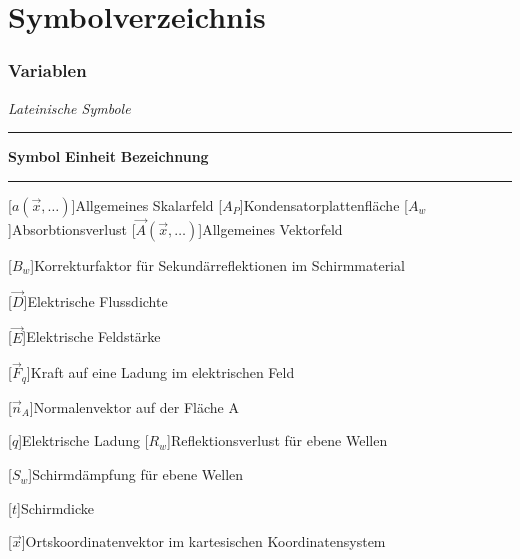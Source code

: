 \chapter*{Symbolverzeichnis}


\subsection*{Variablen}
\vspace{\linespace}
\textit{Lateinische Symbole} \\[.5\linespace]
\noindent\rule{\textwidth}{0.5pt}
\textbf{Symbol} \hspace{12.5mm} \textbf{Einheit} \hspace{10.5mm} \textbf{Bezeichnung} \\[-\linespace]
\noindent\rule{\textwidth}{0.5pt}

\begin{acronym}[Platzhalterwort]

[$a(\vec x,\ldots)$]{\acrounit{-}Allgemeines Skalarfeld}
[$A_P$]{\acrounit{\square\meter}Kondensatorplattenfläche}
[$A_w$]{\acrounit{\Dezibel}Absorbtionsverlust}
[$\vec A(\vec x,\ldots)$]{\acrounit{-}Allgemeines Vektorfeld}

[$B_w$]{\acrounit{\Dezibel}Korrekturfaktor für Sekundärreflektionen im Schirmmaterial}

[$\vec D$]{\acrounit{\ampere\second\per\square\meter}Elektrische Flussdichte}

[$\vec E$]{\acrounit{\volt\per\meter}Elektrische Feldstärke}

[$\vec F_q$]{\acrounit{\newton}Kraft auf eine Ladung im elektrischen Feld}

[$\vec n_A$]{Normalenvektor auf der Fläche A}

[$q$]{\acrounit{\ampere\second}Elektrische Ladung}
[$R_w$]{\acrounit{\Dezibel}Reflektionsverlust für ebene Wellen}

[$S_w$]{\acrounit{\Dezibel}Schirmdämpfung für ebene Wellen}

[$t$]{\acrounit{\meter}Schirmdicke}

[$\vec x$]{\acrounit{-}Ortskoordinatenvektor im kartesischen Koordinatensystem}

\end{acronym}
\newpage




